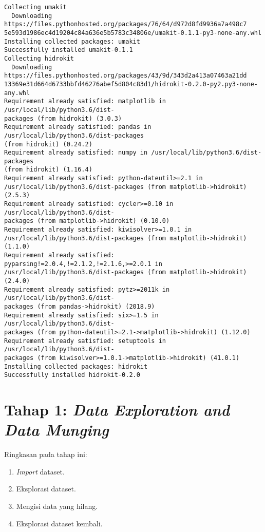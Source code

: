 \documentclass[11pt]{article}
\providecommand{\tightlist}{%
      \setlength{\itemsep}{0pt}\setlength{\parskip}{0pt}}
\begin{document}
    \begin{Verbatim}[commandchars=\\\{\}]
Collecting umakit
  Downloading https://files.pythonhosted.org/packages/76/64/d972d8fd9936a7a498c7
5e593d1986ec4d19204c84a636e5b5783c34806e/umakit-0.1.1-py3-none-any.whl
Installing collected packages: umakit
Successfully installed umakit-0.1.1
Collecting hidrokit
  Downloading https://files.pythonhosted.org/packages/43/9d/343d2a413a07463a21dd
13369e31d664d6733bbfd46276abef5d804c83d1/hidrokit-0.2.0-py2.py3-none-any.whl
Requirement already satisfied: matplotlib in /usr/local/lib/python3.6/dist-
packages (from hidrokit) (3.0.3)
Requirement already satisfied: pandas in /usr/local/lib/python3.6/dist-packages
(from hidrokit) (0.24.2)
Requirement already satisfied: numpy in /usr/local/lib/python3.6/dist-packages
(from hidrokit) (1.16.4)
Requirement already satisfied: python-dateutil>=2.1 in
/usr/local/lib/python3.6/dist-packages (from matplotlib->hidrokit) (2.5.3)
Requirement already satisfied: cycler>=0.10 in /usr/local/lib/python3.6/dist-
packages (from matplotlib->hidrokit) (0.10.0)
Requirement already satisfied: kiwisolver>=1.0.1 in
/usr/local/lib/python3.6/dist-packages (from matplotlib->hidrokit) (1.1.0)
Requirement already satisfied: pyparsing!=2.0.4,!=2.1.2,!=2.1.6,>=2.0.1 in
/usr/local/lib/python3.6/dist-packages (from matplotlib->hidrokit) (2.4.0)
Requirement already satisfied: pytz>=2011k in /usr/local/lib/python3.6/dist-
packages (from pandas->hidrokit) (2018.9)
Requirement already satisfied: six>=1.5 in /usr/local/lib/python3.6/dist-
packages (from python-dateutil>=2.1->matplotlib->hidrokit) (1.12.0)
Requirement already satisfied: setuptools in /usr/local/lib/python3.6/dist-
packages (from kiwisolver>=1.0.1->matplotlib->hidrokit) (41.0.1)
Installing collected packages: hidrokit
Successfully installed hidrokit-0.2.0
    \end{Verbatim}

    \hypertarget{tahap-1-data-exploration-and-data-munging}{%
\section{\texorpdfstring{Tahap 1: \emph{Data Exploration and Data
Munging}}{Tahap 1: Data Exploration and Data Munging}}\label{tahap-1-data-exploration-and-data-munging}}

Ringkasan pada tahap ini:

\begin{enumerate}
\def\labelenumi{\arabic{enumi}.}
\tightlist
\item
  \emph{Import} dataset.
\item
  Eksplorasi dataset.
\item
  Mengisi data yang hilang.
\item
  Eksplorasi dataset kembali.
\end{enumerate}
\end{document}
